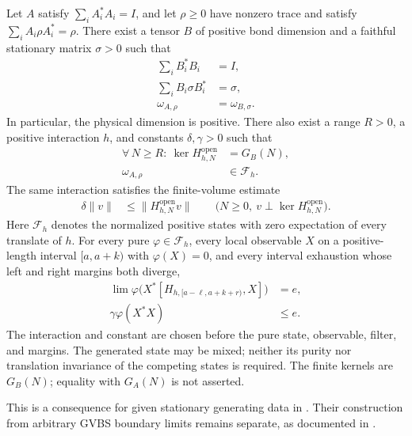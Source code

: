 \begin{theorem}
    \label{thm:stationary_generators_finite_quasi_local_gap}
    \leanok
    Let $A$ satisfy $\sum_i A_i^*A_i=I$, and let $\rho\geq0$ have
    nonzero trace and satisfy $\sum_i A_i\rho A_i^*=\rho$.
    There exist a tensor $B$ of positive bond dimension and a faithful
    stationary matrix $\sigma>0$ such that
    \begin{align}
        \sum_i B_i^*B_i        & =I,
        \\
        \sum_i B_i\sigma B_i^* & =\sigma,
        \\
        \omega_{A,\rho}        & =\omega_{B,\sigma}.
    \end{align}
    In particular, the physical dimension is positive. There also exist
    a range $R>0$, a positive interaction $h$, and constants
    $\delta,\gamma>0$ such that
    \begin{align}
        \forall\,N\geq R:\ \ker H^{\mathrm{open}}_{h,N} & =G_B(N),
        \\
        \omega_{A,\rho}                                 & \in\mathcal F_h.
    \end{align}
    The same interaction satisfies the finite-volume estimate
    \begin{align}
        \delta\|v\| & \leq\|H^{\mathrm{open}}_{h,N}v\|
        \qquad\bigl(N\geq0,\ v\perp\ker H^{\mathrm{open}}_{h,N}\bigr).
    \end{align}
    Here $\mathcal F_h$ denotes the normalized positive states with zero
    expectation of every translate of $h$. For every pure
    $\varphi\in\mathcal F_h$, every local observable $X$ on a
    positive-length interval $[a,a+k)$ with $\varphi(X)=0$, and every
    interval exhaustion whose left and right margins both diverge,
    \begin{align}
        \lim \varphi\bigl(X^*[H_{h,[a-\ell,a+k+r)},X]\bigr) & =e,
        \\
        \gamma\varphi(X^*X)                                 & \leq e.
    \end{align}
    The interaction and constant are chosen before the pure state,
    observable, filter, and margins. The generated state may be mixed;
    neither its purity nor translation invariance of the competing
    states is required. The finite kernels are $G_B(N)$; equality with
    $G_A(N)$ is not asserted.

    This is a consequence for given stationary generating data in
    \cite[Section~3]{Nachtergaele1996Spectral}. Their construction from
    arbitrary GVBS boundary limits remains separate, as documented in
    \cite{gap:nachtergaele96_infinite_volume_ground_projection}.
\end{theorem}

